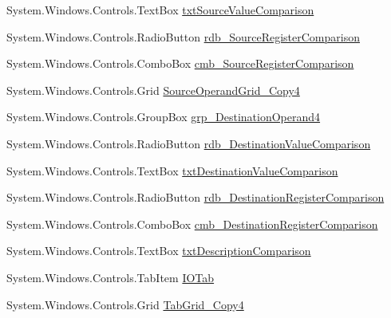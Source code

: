 \begin{DoxyCompactItemize}
\item 
System.\+Windows.\+Controls.\+Text\+Box \hyperlink{class_c_p_u___o_s___simulator_1_1_instructions_window_a8dd17881b7fd4e1923899b5bcae171fc}{txt\+Source\+Value\+Comparison}
\item 
System.\+Windows.\+Controls.\+Radio\+Button \hyperlink{class_c_p_u___o_s___simulator_1_1_instructions_window_afa2620b93d7d354b0632d7c290022545}{rdb\+\_\+\+Source\+Register\+Comparison}
\item 
System.\+Windows.\+Controls.\+Combo\+Box \hyperlink{class_c_p_u___o_s___simulator_1_1_instructions_window_af7acb32053b1cf27ee94bbf47efc9fbe}{cmb\+\_\+\+Source\+Register\+Comparison}
\item 
System.\+Windows.\+Controls.\+Grid \hyperlink{class_c_p_u___o_s___simulator_1_1_instructions_window_aa8c70305e3c77644ac312df74b0696b7}{Source\+Operand\+Grid\+\_\+\+Copy4}
\item 
System.\+Windows.\+Controls.\+Group\+Box \hyperlink{class_c_p_u___o_s___simulator_1_1_instructions_window_a68c2f892a54f7826baacf9c828431fa8}{grp\+\_\+\+Destination\+Operand4}
\item 
System.\+Windows.\+Controls.\+Radio\+Button \hyperlink{class_c_p_u___o_s___simulator_1_1_instructions_window_a200445a2378fddf69041aecbbcdf68fb}{rdb\+\_\+\+Destination\+Value\+Comparison}
\item 
System.\+Windows.\+Controls.\+Text\+Box \hyperlink{class_c_p_u___o_s___simulator_1_1_instructions_window_ab44686bd174144a0c1042579d6665547}{txt\+Destination\+Value\+Comparison}
\item 
System.\+Windows.\+Controls.\+Radio\+Button \hyperlink{class_c_p_u___o_s___simulator_1_1_instructions_window_af5369f91639cf92cbb6bd89118d6e373}{rdb\+\_\+\+Destination\+Register\+Comparison}
\item 
System.\+Windows.\+Controls.\+Combo\+Box \hyperlink{class_c_p_u___o_s___simulator_1_1_instructions_window_af209ebdcd0b9ae6c267388b382dac245}{cmb\+\_\+\+Destination\+Register\+Comparison}
\item 
System.\+Windows.\+Controls.\+Text\+Box \hyperlink{class_c_p_u___o_s___simulator_1_1_instructions_window_a1ac2050428b5ece7f1f6791771e9cef6}{txt\+Description\+Comparison}
\item 
System.\+Windows.\+Controls.\+Tab\+Item \hyperlink{class_c_p_u___o_s___simulator_1_1_instructions_window_aaf736178464d8313c866ab6efeae19c5}{I\+O\+Tab}
\item 
System.\+Windows.\+Controls.\+Grid \hyperlink{class_c_p_u___o_s___simulator_1_1_instructions_window_a33c64471b02aed8597462149051c2b51}{Tab\+Grid\+\_\+\+Copy4}

\end{DoxyCompactItemize}
